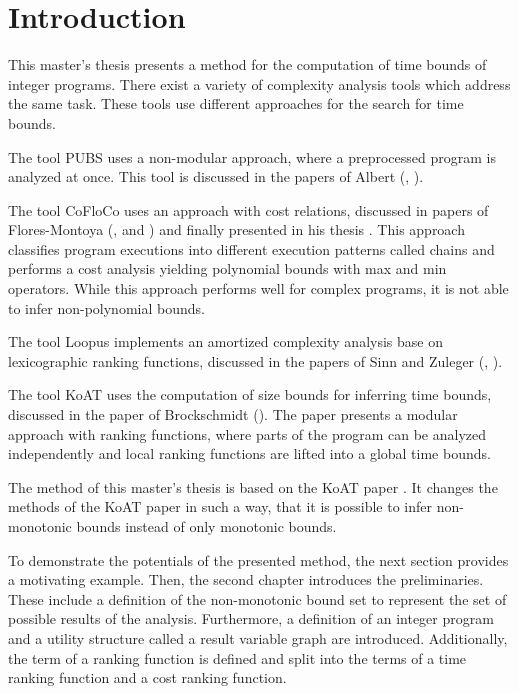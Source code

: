 \section{Introduction}

This master's thesis presents a method for the computation of time bounds of integer programs.
There exist a variety of complexity analysis tools which address the same task.
These tools use different approaches for the search for time bounds.

The tool PUBS uses a non-modular approach, where a preprocessed program is analyzed at once.
This tool is discussed in the papers of Albert (\cite{pubs1}, \cite{pubs2}).

The tool CoFloCo uses an approach with cost relations, discussed in papers of Flores-Montoya (\cite{cofloco1}, \cite{cofloco2} and \cite{cofloco4}) and finally presented in his thesis \cite{cofloco3}.
This approach classifies program executions into different execution patterns called chains and performs a cost analysis yielding polynomial bounds with max and min operators. 
While this approach performs well for complex programs, it is not able to infer non-polynomial bounds.

The tool Loopus implements an amortized complexity analysis base on lexicographic ranking functions, discussed in the papers of Sinn and Zuleger (\cite{loopus1}, \cite{loopus2}).

The tool KoAT uses the computation of size bounds for inferring time bounds, discussed in the paper of Brockschmidt (\cite{koat}).
The paper presents a modular approach with ranking functions, where parts of the program can be analyzed independently and local ranking functions are lifted into a global time bounds.

The method of this master's thesis is based on the KoAT paper \cite{koat}.
It changes the methods of the KoAT paper \cite{koat} in such a way, that it is possible to infer non-monotonic bounds instead of only monotonic bounds.

To demonstrate the potentials of the presented method, the next section provides a motivating example.
Then, the second chapter introduces the preliminaries.
These include a definition of the non-monotonic bound set to represent the set of possible results of the analysis.
Furthermore, a definition of an integer program and a utility structure called a result variable graph are introduced.
Additionally, the term of a ranking function is defined and split into the terms of a time ranking function and a cost ranking function.


